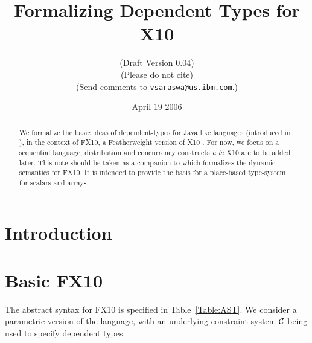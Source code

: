 \documentclass{article}
\def\Xten{{\sf X10}}
\def\FXten{{\sf FX10}}
\begin{document}
\title{Formalizing Dependent Types for \Xten}
\author{
({\sc Draft Version 0.04})\\
(Please do not cite)\\
(Send comments to {\tt vsaraswa@us.ibm.com}.)
}

\date{April 19 2006}
\maketitle

\begin{abstract}
We formalize the basic ideas of dependent-types for Java like
languages (introduced in \cite{DependentTypes}), in the context of
\FXten, a Featherweight version of \Xten{} \cite{X10}.  For now, we
focus on a sequential language; distribution and concurrency
constructs {\em a la} \Xten{} are to be added later. This note should
be taken as a companion to \cite{X10-concur} which formalizes the
dynamic semantics for \FXten. It is intended to provide the basis for
a place-based type-system for scalars and arrays.
\end{abstract}

\section{Introduction}

\section{Basic \FXten}
The abstract syntax for \FXten{} is specified in
Table~\ref{Table:AST}. We consider a parametric version of the
language, with an underlying constraint system $\cal C$ \cite{cccc} being used to
specify dependent types. 

\end{document}
